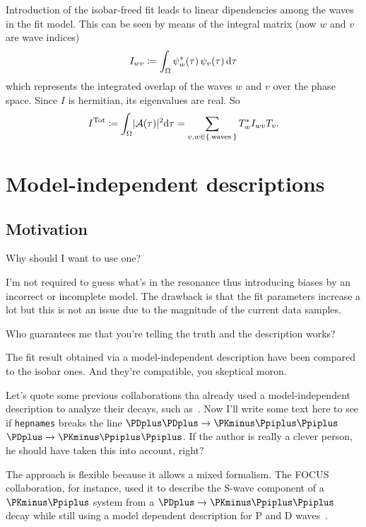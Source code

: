 \documentclass[
	fontsize=10pt,
	open=right,
	twoside,
    english,
    draft,
]{scrbook}
\newcommand{\A}{\ensuremath{\mathcal{A}}}
\begin{document}
Introduction of the isobar-freed fit leads to linear dipendencies among the waves in the fit model.
This can be seen by means of the integral matrix (now $w$ and $v$ are wave indices)
\begin{equation}
    I_{wv} \coloneqq \int_\Omega \psi_w^*(\tau)\,\psi_v(\tau)\mathop{}\!\textup{d}\tau
\end{equation}
which represents the integrated overlap of the waves $w$ and $v$ over the phase space.
Since $I$ is hermitian, its eigenvalues are real.
So
\begin{equation}
    I^{\text{Tot}} \coloneqq \int_\Omega \abs{\A(\tau)}^2\!\ud \tau = \sum_{v,w \in \Set{\text{waves}}} T_w^* I_{wv} T_v.
\end{equation}

\section{Model-independent descriptions}

\subsection{Motivation}

Why should I want to use one?

I'm not required to guess what's in the resonance thus introducing biases by an incorrect or incomplete model.
The drawback is that the fit parameters increase a lot but this is not an issue due to the magnitude of the current data samples.


Who guarantees me that you're telling the truth and the description works?

The fit result obtained via a model-independent description have been compared to the isobar ones.
And they're compatible, you skeptical moron.


Let's quote some previous collaborations tha already used a model-independent description to analyze their decays, such as~\cite{PhysRevD.73.032004,Link200914}.
Now I'll write some text here to see if \texttt{hepnames} breaks the line $\PDplus\cramped{\PDplus} \to \PKminus\Ppiplus\Ppiplus$ $\cramped{\PDplus \to \PKminus\Ppiplus\Ppiplus}$.
If the author is really a clever person, he should have taken this into account, right?


The approach is flexible because it allows a mixed formalism.
The FOCUS collaboration, for instance, used it to describe the S-wave component of a $\PKminus\Ppiplus$ system from a $\PDplus \to \PKminus\Ppiplus\Ppiplus$ decay while still using a model dependent description for P and D waves~\cite{Link200914}.
\end{document}
